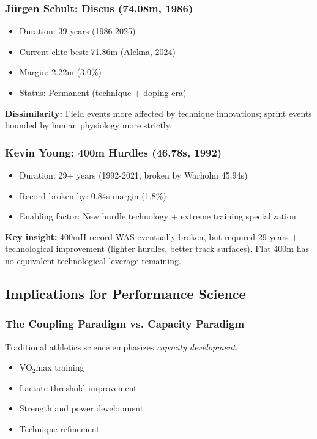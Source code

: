 \subsubsection{Jürgen Schult: Discus (74.08m, 1986)}

\begin{itemize}
    \item Duration: 39 years (1986-2025)
    \item Current elite best: 71.86m (Alekna, 2024)
    \item Margin: 2.22m (3.0\%)
    \item Status: Permanent (technique + doping era)
\end{itemize}

\textbf{Dissimilarity:} Field events more affected by technique innovations; sprint events bounded by human physiology more strictly.

\subsubsection{Kevin Young: 400m Hurdles (46.78s, 1992)}

\begin{itemize}
    \item Duration: 29+ years (1992-2021, broken by Warholm 45.94s)
    \item Record broken by: 0.84s margin (1.8\%)
    \item Enabling factor: New hurdle technology + extreme training specialization
\end{itemize}

\textbf{Key insight:} 400mH record WAS eventually broken, but required 29 years + technological improvement (lighter hurdles, better track surfaces). Flat 400m has no equivalent technological leverage remaining.

\subsection{Implications for Performance Science}

\subsubsection{The Coupling Paradigm vs. Capacity Paradigm}

Traditional athletics science emphasizes \textit{capacity development:}
\begin{itemize}
    \item VO$_2$max training
    \item Lactate threshold improvement
    \item Strength and power development
    \item Technique refinement
\end{itemize}


